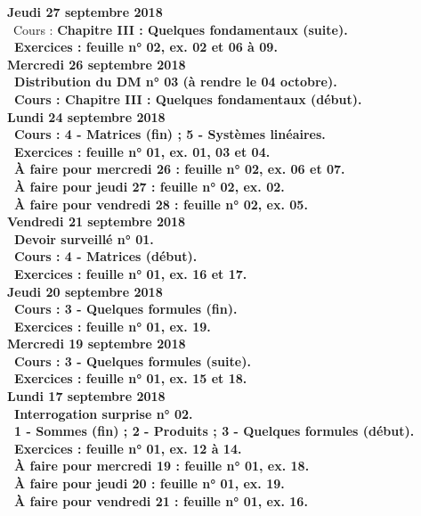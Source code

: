 \documentclass[12pt,a4paper]{article}
\begin{document}
\noindent\textbf{Jeudi 27 septembre 2018}\\
\bu\ Cours : \bf Chapitre III \rm : Quelques fondamentaux (suite).\\
\bu\ Exercices : feuille n° 02, ex. 02 et 06 à 09.\vspace{.4cm}\\

\noindent\textbf{\bf Mercredi 26 septembre 2018}\\
\bu\ Distribution du DM n° 03 (à rendre le 04 octobre).\\
\bu\ Cours : \bf Chapitre III \rm : Quelques fondamentaux (début).\vspace{.4cm}\\

\noindent\textbf{\bf Lundi 24 septembre 2018}\\
\bu\ Cours : 4 - Matrices (fin) ; 5 - Systèmes linéaires.\\
\bu\ Exercices : feuille n° 01, ex. 01, 03 et 04.\\
\bu\ À faire pour mercredi 26 : feuille n° 02, ex. 06 et 07.\\
\bu\ À faire pour jeudi 27 : feuille n° 02, ex. 02.\\
\bu\ À faire pour vendredi 28 : feuille n° 02, ex. 05.\vspace{.4cm}\\ 

\noindent\textbf{Vendredi 21 septembre 2018}\\
\bu\ Devoir surveillé n° 01.\\
\bu\ Cours : 4 - Matrices (début).\\
\bu\ Exercices : feuille n° 01, ex. 16 et 17.\vspace{.4cm}\\
 
\noindent\textbf{Jeudi 20 septembre 2018}\\
\bu\ Cours : 3 - Quelques formules (fin).\\
\bu\ Exercices : feuille n° 01, ex. 19.\vspace{.4cm}\\

\noindent\textbf{\bf Mercredi 19 septembre 2018}\\
\bu\ Cours : 3 - Quelques formules (suite).\\
\bu\ Exercices : feuille n° 01, ex. 15 et 18.\vspace{.4cm}\\

\noindent\textbf{\bf Lundi 17 septembre 2018}\\ 
\bu\ Interrogation surprise n° 02.\\
\bu\ 1 - Sommes (fin) ; 2 - Produits ; 3 - Quelques formules (début).\\
\bu\ Exercices : feuille n° 01, ex. 12 à 14.\\
\bu\ À faire pour mercredi 19 : feuille n° 01, ex. 18.\\
\bu\ À faire pour jeudi 20 : feuille n° 01, ex. 19.\\
\bu\ À faire pour vendredi 21 : feuille n° 01, ex. 16.\vspace{.4cm}\\
\end{document}
